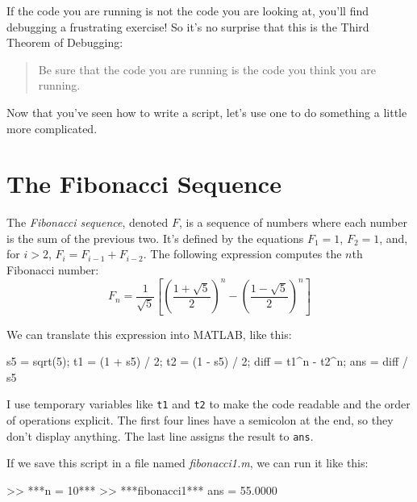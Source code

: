 

If the code you are running is not the code you are looking
at, you'll find debugging a frustrating exercise!  So it's no surprise that this is the Third Theorem of Debugging:

\begin{quote}
Be sure that the code you are running
is the code you think you are running.
\end{quote}

Now that you've seen how to write a script, let's use one to do something a little more complicated. 

\section{The Fibonacci Sequence}


The \emph{Fibonacci sequence}, denoted $F$, is a sequence of numbers where each number is the sum of the previous two. 
It's defined by the equations $F_1 = 1$, $F_2 = 1$, and, for $i > 2$, $F_{i} = F_{i-1} + F_{i-2}$.
The following expression computes the $n$th Fibonacci number:
%
\begin{equation*}
F_n = \frac{1}{\sqrt{5}}
\left[
\left( \frac{1 + \sqrt{5}}{2} \right)^{n} -
\left( \frac{1 - \sqrt{5}}{2} \right)^{n}
\right]
\end{equation*}
%

We can translate this expression into MATLAB, like this:

\begin{code}
s5 = sqrt(5);
t1 = (1 + s5) / 2;
t2 = (1 - s5) / 2;
diff = t1^n - t2^n;
ans = diff / s5
\end{code}

I use temporary variables like \lstinline{t1} and \lstinline{t2} to make the code readable and the order of operations explicit.  The first four lines have a semicolon at the end, so they don't display anything.  The last line assigns the result to \lstinline{ans}.


If we save this script in a file named \emph{fibonacci1.m}, we can run it like this:

\begin{code}
>> ***n = 10***
>> ***fibonacci1***
ans = 55.0000
\end{code}

